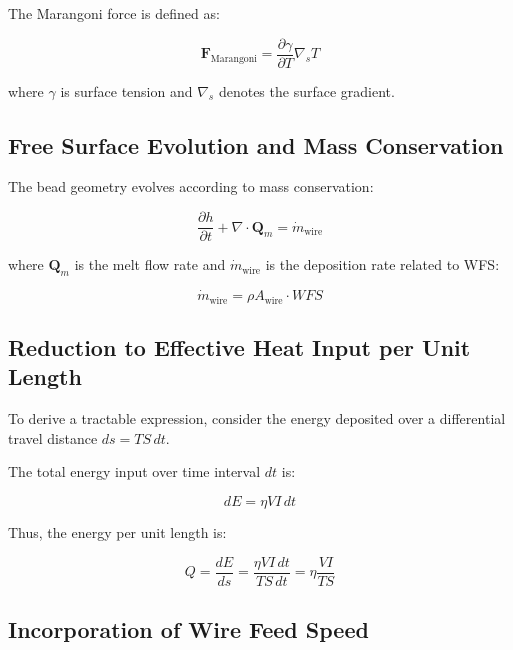 \documentclass[conference]{IEEEtran}
\begin{document}
The Marangoni force is defined as:

\begin{equation}
\mathbf{F}_{\mathrm{Marangoni}}
=
\frac{\partial \gamma}{\partial T}
\nabla_s T
\end{equation}

where $\gamma$ is surface tension and $\nabla_s$ denotes the surface gradient.

\subsection{Free Surface Evolution and Mass Conservation}

The bead geometry evolves according to mass conservation:

\begin{equation}
\frac{\partial h}{\partial t}
+
\nabla \cdot \mathbf{Q}_m
=
\dot{m}_{\mathrm{wire}}
\label{eq:mass_surface}
\end{equation}

where $\mathbf{Q}_m$ is the melt flow rate and $\dot{m}_{\mathrm{wire}}$ is the deposition rate related to WFS:

\begin{equation}
\dot{m}_{\mathrm{wire}} = \rho A_{\mathrm{wire}} \cdot WFS
\end{equation}

\subsection{Reduction to Effective Heat Input per Unit Length}

To derive a tractable expression, consider the energy deposited over a differential travel distance $ds = TS \, dt$.

The total energy input over time interval $dt$ is:

\begin{equation}
dE = \eta V I \, dt
\end{equation}

Thus, the energy per unit length is:

\begin{equation}
Q = \frac{dE}{ds}
= \frac{\eta V I \, dt}{TS \, dt}
= \eta \frac{V I}{TS}
\label{eq:Q_derivation}
\end{equation}

\subsection{Incorporation of Wire Feed Speed}
\end{document}

